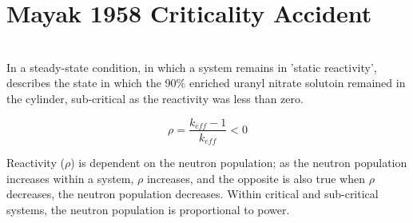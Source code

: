 \documentclass[11pt,a4paper]{article}
\newcommand*\sq{\mathbin{\vcenter{\hbox{\rule{.3ex}{.3ex}}}}} %
\begin{document}


\section{Mayak 1958 Criticality Accident}
 \\

In a steady-state condition, in which a system remains in 'static reactivity', describes the state in which the 90$\%$ enriched uranyl nitrate solutoin remained in the cylinder, sub-critical as the reactivity was less than zero.

\begin{equation}
\rho = \frac{k_{eff}-1}{k_{eff}} < 0
\end{equation}

Reactivity ($\rho$) is dependent on the neutron population; as the neutron population increases within a system, $\rho$ increases, and the opposite is also true when $\rho$ decreases, the neutron population decreases. Within critical and sub-critical systems, the neutron population is proportional to power. \\
\end{document}
